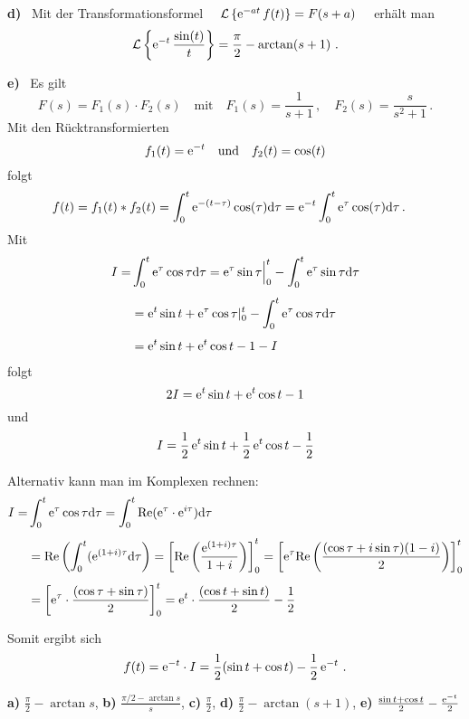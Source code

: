 {\textbf{d)} \ Mit der Transformationsformel \ \ ${\cal{L}}\left\{\mathrm{e}^{-at}\,f(t)\right\} = F(s+a)$ \ \ erhält man
	\[
	{\cal{L}}\left\{\mathrm{e}^{-t}\,\frac{\sin(t)}{t}\right\} = \dfrac \pi2-\arctan(s+1)\ .
\]


\textbf{e)} \ Es gilt
$$
F(s) = F_1(s) \cdot F_2(s) \quad \mbox{mit} \quad F_1(s) = \dfrac{1}{s+1}\,, \quad F_2(s)= \dfrac{s}{s^2+1}\,.
$$
Mit den Rücktransformierten 
$$
f_1(t) = \mathrm{e}^{-t} \quad \mbox{und} \quad f_2(t) = \cos( t)
$$
folgt
\begin{align*}
f(t) & = f_1(t) \ast f_2(t) = \int_0^t \mathrm{e}^{-(t-\tau)}\cos (\tau) \text d \tau = \mathrm{e}^{-t} \int_0^t \mathrm{e}^{\tau}\cos (\tau) \text d \tau\,.
\end{align*}
Mit 
\begin{align*}
I=&\int_0^t \mathrm{e}^{\tau}\cos \tau \text d \tau  = \mathrm{e}^{\tau}\sin \tau\Big|_0^t -  \int_0^t \mathrm{e}^{\tau}\sin \tau \text d \tau\\[1ex]
& =  \mathrm{e}^{t}\sin t + \mathrm{e}^{\tau}\cos \tau |_0^t - \int_0^t \mathrm{e}^{\tau}\cos \tau \text d \tau\\[1ex]
& =  \mathrm{e}^{t}\sin t + \mathrm{e}^{t}\cos t - 1  - I
\end{align*}
folgt
$$2I=\mathrm{e}^{t}\sin t + \mathrm{e}^{t}\cos t - 1$$
und
$$
I = \dfrac{1}{2}\,\mathrm{e}^{t}\sin t + \dfrac{1}{2}\,\mathrm{e}^{t}\cos t - \dfrac{1}{2}
$$


Alternativ kann man im Komplexen rechnen:
\begin{align*}
I=&\int_0^t \mathrm{e}^{\tau}\cos \tau \text d \tau  =\int_0^t \mathrm{Re}(\mathrm{e}^{\tau}\cdot\mathrm{e}^{i\tau})  \text d \tau \\[1ex]
&=\mathrm{Re}\left(\int_0^t (\mathrm{e}^{(1+i)\tau}\text d \tau\right) =\left[\mathrm{Re}\left(\dfrac{\mathrm{e}^{(1+i)\tau}}{1+i}\right)\right]_0^t=\left[\mathrm{e}^{\tau}\mathrm{Re}\left(\dfrac{(\cos\tau+i\sin\tau)(1-i)}{2}\right)\right]_0^t\\[1ex]
&=\left[\mathrm{e}^{\tau}\cdot\dfrac{(\cos\tau+\sin\tau)}{2}\right]_0^t=\mathrm{e}^{t}\cdot\dfrac{(\cos t+\sin t)}{2}-\dfrac{1}{2}\\
\end{align*}

Somit ergibt sich
$$
\ f(t) = \EH{-t} \cdot I=\dfrac{1}{2} (\sin t + \cos t) - \dfrac{1}{2}\,\EH{-t}\ .\ 
$$

}

{
\textbf{ a)} $\frac \pi 2 - \arctan s$, 
\textbf{ b)} $\frac {\pi/2-\arctan s} s$, 
\textbf{ c)} $\frac \pi 2$,
\textbf{ d)} $\frac \pi 2 - \arctan (s+1)$,
\textbf{ e)} $\frac {\sin t + \cos t}2 - \frac{\mathrm{e}^{-t}}2$
}
